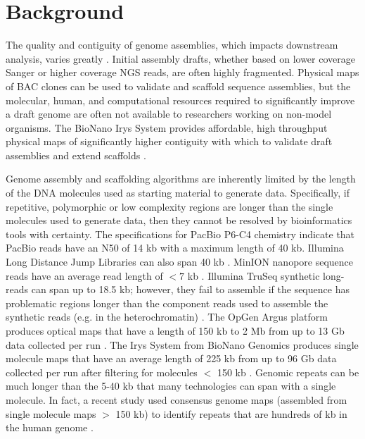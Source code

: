 \documentclass{bmcart}
\begin{document}

\section*{Background}

The quality and contiguity of genome assemblies, which impacts downstream analysis, varies greatly \cite{Gage2012,Feature-by-F2012,Assem22013}. Initial assembly drafts, whether based on lower coverage Sanger or higher coverage NGS reads, are often highly fragmented. Physical maps of BAC clones can be used to validate and scaffold sequence assemblies, but the molecular, human, and computational resources required to significantly improve a draft genome are often not available to researchers working on non-model organisms. The BioNano Irys\textregistered\textnormal{ }System provides affordable, high throughput physical maps of significantly higher contiguity with which to validate draft assemblies and extend scaffolds \cite{BioNano2010}.

Genome assembly and scaffolding algorithms are inherently limited by the length of the DNA molecules used as starting material to generate data. Specifically, if repetitive, polymorphic or low complexity regions are longer than the single molecules used to generate data, then they cannot be resolved by bioinformatics tools with certainty. The specifications for PacBio P6-C4 chemistry \cite{PacBioSpecs} indicate that PacBio reads have an N50 of 14 kb with a maximum length of 40 kb. Illumina Long Distance Jump Libraries can also span 40 kb \cite{LDJSpecs}. MinION nanopore sequence reads have an average read length of $< 7$ kb \cite{Nanopore2014}. Illumina TruSeq synthetic long-reads can span up to 18.5 kb; however, they fail to assemble if the sequence has problematic regions longer than the component reads used to assemble the synthetic reads (e.g. in the heterochromatin) \cite{Moleculo2014}. The OpGen Argus \cite{Argos2009} platform produces optical maps that have a length of 150 kb to 2 Mb from up to 13 Gb data collected per run \cite{OpgenSpecs}. The Irys System from BioNano Genomics produces single molecule maps that have an average length of 225 kb from up to 96 Gb data collected per run after filtering for molecules $<$ 150 kb \cite{BioNanoSpecs}. Genomic repeats can be much longer than the 5-40 kb that many technologies can span with a single molecule. In fact, a recent study used consensus genome maps (assembled from single molecule maps $>$ 150 kb) to identify repeats that are hundreds of kb in the human genome \cite{BioNanoSV2014}.
\end{document}
